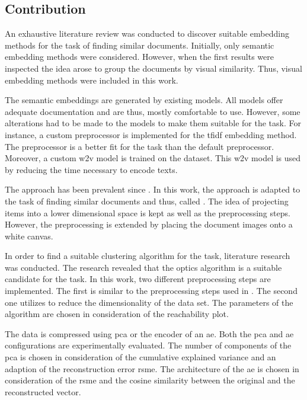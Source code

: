 \subsection{Contribution}\label{subsec:contribution}
An exhaustive literature review was conducted to discover suitable embedding methods for the task of finding similar documents.
Initially, only semantic embedding methods were considered.
However, when the first results were inspected the idea arose to group the documents by visual similarity.
Thus, visual embedding methods were included in this work.

The semantic embeddings are generated by existing models.
All models offer adequate documentation and are thus, mostly comfortable to use.
However, some alterations had to be made to the models to make them suitable for the task.
For instance, a custom preprocessor is implemented for the \ac{tfidf} embedding method.
The preprocessor is a better fit for the task than the default preprocessor.
Moreover, a custom \ac{w2v} model is trained on the dataset.
This \ac{w2v} model is used by \infersent{} reducing the time necessary to encode texts.

The \eigenfaces{} approach has been prevalent since \citeyear{eigenfaces1991}.
In this work, the approach is adapted to the task of finding similar documents and thus, called \eigendocs{}.
The idea of projecting items into a lower dimensional space is kept as well as the preprocessing steps.
However, the preprocessing is extended by placing the document images onto a white canvas.


In order to find a suitable clustering algorithm for the task, literature research was conducted.
The research revealed that the \ac{optics} algorithm is a suitable candidate for the task.
In this work, two different preprocessing steps are implemented.
The first is similar to the preprocessing steps used in \cite{OPTICS1999}.
The second one utilizes \eigendocs{} to reduce the dimensionality of the data set.
The parameters of the algorithm are chosen in consideration of the reachability plot.


The data is compressed using \ac{pca} or the encoder of an \ac{ae}.
Both the \ac{pca} and \ac{ae} configurations are experimentally evaluated.
The number of components of the \ac{pca} is chosen in consideration of the cumulative explained variance 
and an adaption of the reconstruction error \ac{rsme}.
The architecture of the \ac{ae} is chosen in consideration of the \ac{rsme} and 
the cosine similarity between the original and the reconstructed vector.


